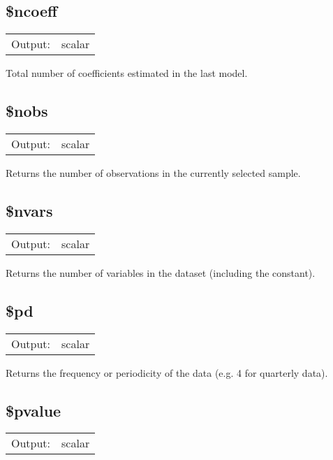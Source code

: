 \subsection{\$ncoeff}
\hypertarget{func-dolncoeff}{}

\begin{tabular}{ll}
Output:     & scalar\\
\end{tabular}

	  Total number of coefficients estimated in the last model.

\subsection{\$nobs}
\hypertarget{func-dnobs}{}

\begin{tabular}{ll}
Output:     & scalar\\
\end{tabular}

	  Returns the number of observations in the currently selected
	  sample.

\subsection{\$nvars}
\hypertarget{func-dolnvars}{}

\begin{tabular}{ll}
Output:     & scalar\\
\end{tabular}

	  Returns the number of variables in the dataset (including the
	  constant).

\subsection{\$pd}
\hypertarget{func-dolpd}{}

\begin{tabular}{ll}
Output:     & scalar\\
\end{tabular}

	  Returns the frequency or periodicity of the data (e.g. 4 for
	  quarterly data).

\subsection{\$pvalue}
\hypertarget{func-dpvalue}{}

\begin{tabular}{ll}
Output:     & scalar\\
\end{tabular}

